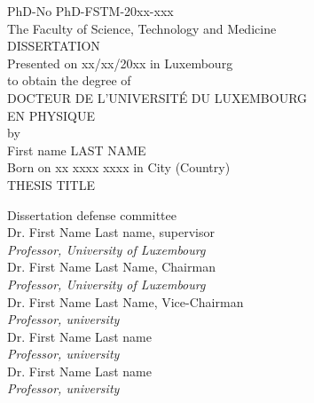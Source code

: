 \documentclass[12pt,a4paper]{book}
\begin{document}
\begin{center}
\footnotesize{PhD-No PhD-FSTM-20xx-xxx }\\
\footnotesize{The Faculty of Science, Technology and Medicine}\\
\vspace{1.0cm}
\Large{DISSERTATION}\\
\vspace{1.0cm}
\normalsize{Presented on xx/xx/20xx in Luxembourg}\\
\vspace{0.25cm}
\normalsize{to obtain the degree of}\\
\vspace{1.0cm}
\Large{DOCTEUR DE L'UNIVERSITÉ DU LUXEMBOURG}\\
\vspace{0.5cm}
\Large{EN PHYSIQUE}\\
\vspace{0.5cm}
by\\
\vspace{0.5cm}
\Large{First name LAST NAME}\\
\vspace{0.25cm}
\normalsize{Born on xx xxxx xxxx in City (Country)}\\
\vspace{1.5cm}
\Large{THESIS TITLE}

{\raggedright
\vspace{1.5cm}
\Large{Dissertation defense committee}\\
\vspace{0.25cm}
\normalsize{Dr. First Name Last name, supervisor}\\
\textit{Professor, University of Luxembourg}\\
\vspace{0.25cm}
\normalsize{Dr. First Name Last Name, Chairman }\\
\textit{Professor, University of Luxembourg}\\
\vspace{0.25cm}
\normalsize{Dr. First Name Last Name, Vice-Chairman}\\
\textit{Professor, university}\\
\vspace{0.25cm}
\normalsize{Dr. First Name Last name}\\
\textit{Professor, university}\\
\vspace{0.25cm}
\normalsize{Dr. First Name Last name}\\
\textit{Professor, university}\\
\vspace{0.25cm}
}
\end{center}
\end{document}
